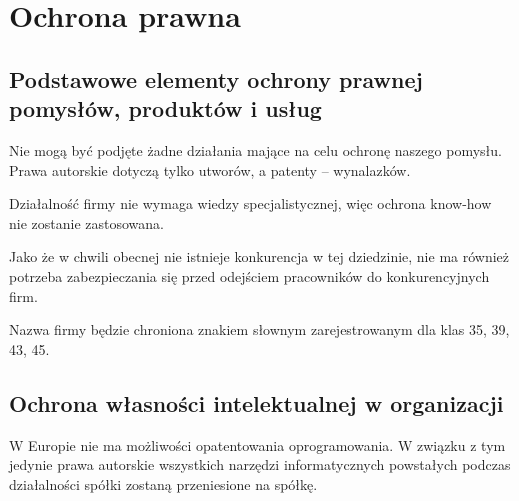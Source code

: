 \documentclass{article}
\begin{document}
\section{Ochrona prawna}
\subsection{Podstawowe elementy ochrony prawnej pomysłów, produktów i usług}
Nie mogą być podjęte żadne działania mające na celu ochronę naszego pomysłu. Prawa autorskie dotyczą tylko utworów, a patenty -- wynalazków. 

Działalność firmy nie wymaga wiedzy specjalistycznej, więc ochrona know-how nie zostanie zastosowana.

Jako że w chwili obecnej nie istnieje konkurencja w tej dziedzinie, nie ma również potrzeba zabezpieczania się przed odejściem pracowników do konkurencyjnych firm.

Nazwa firmy będzie chroniona znakiem słownym zarejestrowanym dla klas 35, 39, 43, 45.
\subsection{Ochrona własności intelektualnej w organizacji}
W Europie nie ma możliwości opatentowania oprogramowania. W związku z tym jedynie prawa autorskie wszystkich narzędzi informatycznych powstałych podczas działalności spółki zostaną przeniesione na spółkę.
\end{document}
